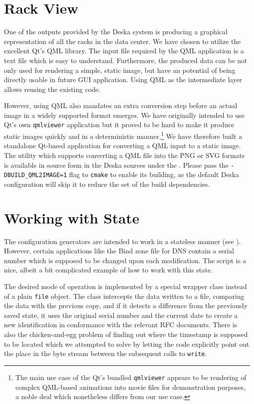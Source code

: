 \documentclass[deska]{subfiles}
\begin{document}
\section{Rack View}
One of the outputs provided by the Deska system is producing a graphical representation of all the racks in the data
center.  We have chosen to utilize the excellent Qt's QML library.  The input file required by the QML application is a
text file which is easy to understand.  Furthermore, the produced data can be not only used for rendering a simple,
static image, but have an potential of being directly usable in future GUI application.  Using QML as the intermediate
layer allows reusing the existing code.

However, using QML also mandates an extra conversion step before an actual image in a widely supported format emerges.
We have originally intended to use Qt's own {\tt qmlviewer} application but it proved to be hard to make it produce
static images quickly and in a deterministic manner.\footnote{The main use case of the Qt's bundled {\tt qmlviewer}
appears to be rendering of complex QML-based animations into movie files for demonstration purposes, a noble deal which
nonetheless differs from our use case.}  We have therefore built a standalone Qt-based application for converting a QML
input to a static image.  The utility which supports converting a QML file into the PNG or SVG formats is available in
source form in the Deska sources under the .  Please pass the {\tt -DBUILD\_QML2IMAGE=1} flag to
{\tt cmake} to enable its building, as the default Deska configuration will skip it to reduce the set of the build
dependencies.

\section{Working with State}

The configuration generators are intended to work in a stateless manner (see ).  However,
certain applications like the Bind zone file for DNS contain a serial number which is supposed to be changed upon each
modification.  The  script is a nice, albeit a bit complicated example of how to work with this state.

The desired mode of operation is implemented by a special wrapper class instead of a plain {\tt file} object.  The class
intercepts the data written to a file, comparing the data with the previous copy, and if it detects a difference from
the previously saved state, it uses the original serial number and the current date to create a new identification in
conformance with the relevant RFC documents.  There is also the chicken-and-egg problem of finding out where the
timestamp is supposed to be located which we attempted to solve by letting the code explicitly point out the place in
the byte stream between the subsequent calls to {\tt write}.
\end{document}
